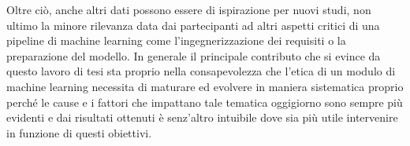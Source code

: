     Oltre ciò, anche altri dati possono essere di ispirazione per nuovi studi, non ultimo la minore rilevanza data dai partecipanti ad altri aspetti critici di una pipeline di machine learning come l'ingegnerizzazione dei requisiti o la preparazione del modello. In generale il principale contributo che si evince da questo lavoro di tesi sta proprio nella consapevolezza che l'etica di un modulo di machine learning necessita di maturare ed evolvere in maniera sistematica proprio perché le cause e i fattori che impattano tale tematica oggigiorno sono sempre più evidenti e dai risultati ottenuti è senz'altro intuibile dove sia più utile intervenire in funzione di questi obiettivi.
\newpage
